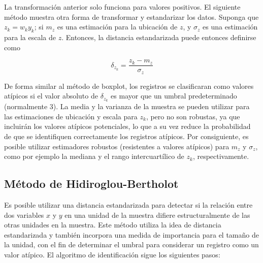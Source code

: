 \documentclass[
  12pt,
  spanish,
]{book}
\begin{document}
La transformación anterior solo funciona para valores positivos. El siguiente método muestra otra forma de transformar y estandarizar los datos. Suponga que \(z_k=w_ky_k\); si \(m_z\) es una estimación para la ubicación de \(z\), y \(\sigma_z\) es una estimación para la escala de \(z\). Entonces, la distancia estandarizada puede entonces definirse como

\[
\delta_{z_k}=\frac{z_k-m_z}{\sigma_z}
\]

De forma similar al método de boxplot, los registros se clasificaran como valores atípicos si el valor absoluto de \(\delta_{z_k}\) es mayor que un umbral predeterminado (normalmente 3). La media y la varianza de la muestra se pueden utilizar para las estimaciones de ubicación y escala para \(z_k\), pero no son robustas, ya que incluirán los valores atípicos potenciales, lo que a su vez reduce la probabilidad de que se identifiquen correctamente los registros atípicos. Por consiguiente, es posible utilizar estimadores robustos (resistentes a valores atípicos) para \(m_z\) y \(\sigma_z\), como por ejemplo la mediana y el rango intercuartílico de \(z_k\), respectivamente.

\hypertarget{muxe9todo-de-hidiroglou-bertholot}{%
\subsection{Método de Hidiroglou-Bertholot}\label{muxe9todo-de-hidiroglou-bertholot}}

Es posible utilizar una distancia estandarizada para detectar si la relación entre dos variables \(x\) y \(y\) en una unidad de la muestra difiere estructuralmente de las otras unidades en la muestra. Este método utiliza la idea de distancia estandarizada y también incorpora una medida de importancia para el tamaño de la unidad, con el fin de determinar el umbral para considerar un registro como un valor atípico. El algoritmo de identificación sigue los siguientes pasos:
\end{document}
